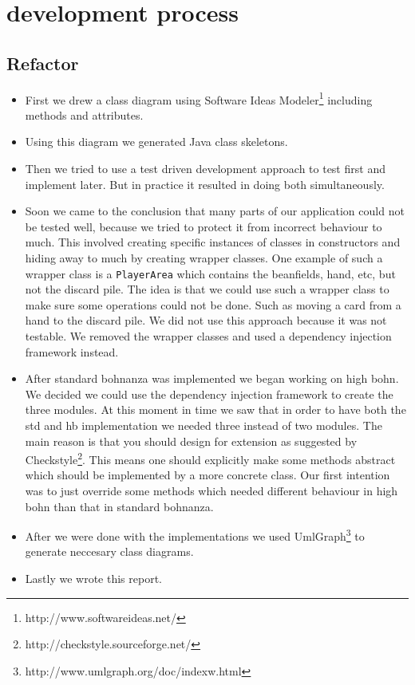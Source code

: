 \section{development process}
\subsection{Refactor}
\begin{itemize}
    \item First we drew a class diagram using Software Ideas
    Modeler\footnote{http://www.softwareideas.net/} including methods and attributes.
    \item Using this diagram we generated Java class skeletons.
    \item Then we tried to use a test driven development approach to test first and implement later.
    But in practice it resulted in doing both simultaneously.
    \item Soon we came to the conclusion that many parts of our application could not be tested
    well, because we tried to protect it from incorrect behaviour to much. This involved creating
    specific instances of classes in constructors and hiding away to much by creating wrapper
    classes. One example of such a wrapper class is a \texttt{PlayerArea} which contains the
    beanfields, hand, etc, but not the discard pile. The idea is that we could use such a wrapper
    class to make sure some operations could not be done. Such as moving a card from a hand to the
    discard pile. We did not use this approach because it was not testable. We removed the wrapper
    classes and used a dependency injection framework instead.
    \item After standard bohnanza was implemented we began working on high bohn. We decided we could
    use the dependency injection framework to create the three modules. At this moment in time we
    saw that in order to have both the \gls{std} and \gls{hb} implementation we needed three instead
    of two modules. The main reason is that you should design for extension as suggested by
    Checkstyle\footnote{http://checkstyle.sourceforge.net/}. This means one should explicitly make
    some methods abstract which should be implemented by a more concrete class. Our first intention
    was to just override some methods which needed different behaviour in high bohn than that in
    standard bohnanza.
    \item After we were done with the implementations we used
    UmlGraph\footnote{http://www.umlgraph.org/doc/indexw.html} to generate neccesary class diagrams.
    \item Lastly we wrote this report. 
\end{itemize}